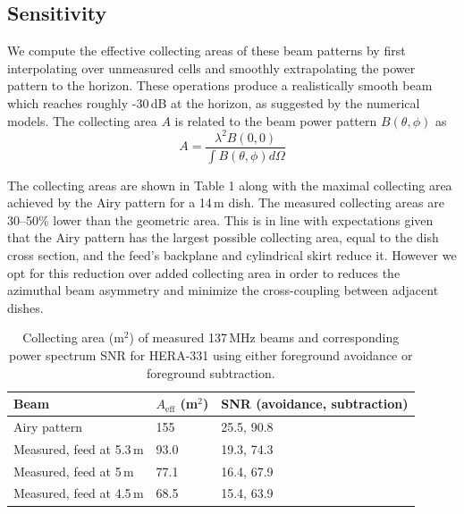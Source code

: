 \documentclass{emulateapj}
\begin{document}
\subsection{Sensitivity}

We compute the effective collecting areas of these beam patterns by first interpolating over unmeasured cells and smoothly extrapolating the power pattern to the horizon. These operations produce a realistically smooth beam which reaches roughly -30\,dB at the horizon, as suggested by the numerical models. The collecting area $A$ is related to the beam power pattern $B(\theta,\phi)$ as
\begin{equation}
	A=\frac{\lambda^2 B(0,0)}{\int B(\theta,\phi)d\Omega}
\end{equation}

The collecting areas are shown in Table 1 along with the maximal collecting area achieved by the Airy pattern for a 14\,m dish. The measured collecting areas are 30--50\% lower than the geometric area. This is in line with expectations given that the Airy pattern has the largest possible collecting area, equal to the dish cross section, and the feed's backplane and cylindrical skirt reduce it. However we opt for this reduction over added collecting area in order to reduces the azimuthal beam asymmetry and minimize the cross-coupling between adjacent dishes.

 \begin{table}[h]
 \caption{ \label{table:collectingareatable}Collecting area (m$^2$) of measured 137\,MHz beams and corresponding power spectrum SNR for HERA-331 using either foreground avoidance or foreground subtraction.}
\begin{tabular}{| l | l | l |}
\hline
Beam & $A_\text{eff}$ (m$^2$) & SNR (avoidance, subtraction)\\
\hline
  Airy pattern & 155 & 25.5, 90.8  \\
    Measured, feed at 5.3\,m & 93.0 & 19.3, 74.3 \\
    Measured, feed at 5\,m & 77.1 &  16.4, 67.9 \\
    Measured, feed at 4.5\,m & 68.5 &  15.4, 63.9 \\ 
  \hline
\end{tabular}
\end{table}
\end{document}
